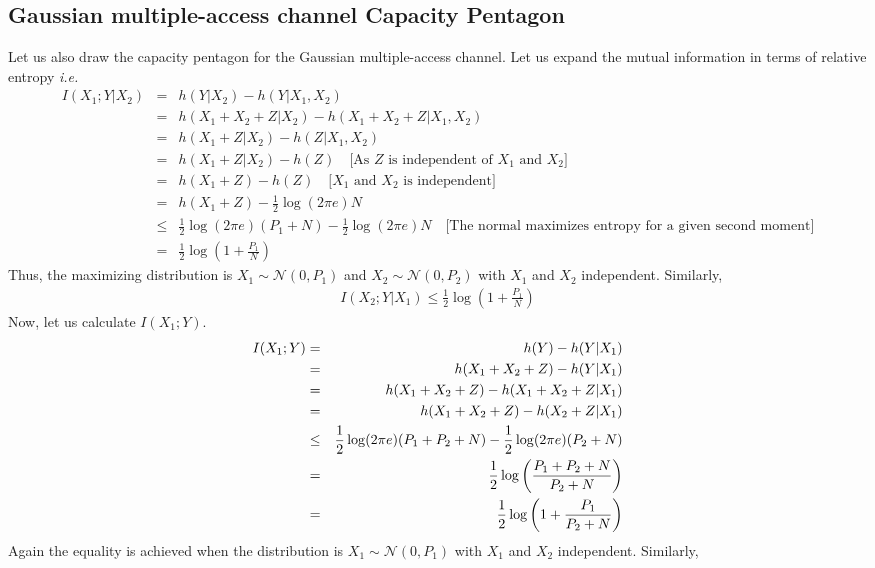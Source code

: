 \subsection{Gaussian multiple-access channel Capacity Pentagon}
Let us also draw the capacity pentagon for the Gaussian multiple-access channel. Let us expand the mutual information in terms of relative entropy \textit{i.e.}
%
\begin{eqnarray}
    I(X_1;Y|X_2) &=& h(Y|X_2) - h(Y|X_1,X_2) \nonumber\\
    &=& h(X_1+X_2+Z|X_2) - h(X_1+X_2+Z|X_1,X_2) \nonumber\\
    &=& h(X_1+Z|X_2) - h(Z|X_1,X_2) \nonumber\\
    &=& h(X_1+Z|X_2) - h(Z) \quad \text{[As $Z$ is independent of $X_1$ and $X_2$]} \nonumber\\
    &=& h(X_1+Z) - h(Z) \quad \text{[$X_1$ and $X_2$ is independent]} \nonumber\\
    &=& h(X_1+Z) - \frac{1}{2}\log(2\pi e)N \nonumber\\
    &\leq& \frac{1}{2}\log(2\pi e)(P_1+N) - \frac{1}{2}\log(2\pi e)N \quad \text{[The normal maximizes entropy for a given second moment]} \nonumber\\
    &=& \frac{1}{2}\log(1+\frac{P_1}{N})
\end{eqnarray}
%
Thus, the maximizing distribution is $X_1 \sim \mathcal{N}(0,P_1)$ and $X_2 \sim \mathcal{N}(0,P_2)$ with $X_1$ and $X_2$ independent. Similarly,
%
\begin{eqnarray}
    I(X_2;Y|X_1) \leq \frac{1}{2}\log(1+\frac{P_1}{N})
\end{eqnarray}
%
Now, let us calculate $I(X_1;Y)$. 
%
\begin{eqnarray}
   I(X_1;Y) &=& h(Y)-h(Y|X_1) \nonumber\\
   &=& h(X_1+X_2+Z)-h(Y|X_1) \nonumber\\
   &=& h(X_1+X_2+Z)-h(X_1+X_2+Z|X_1) \nonumber\\
   &=& h(X_1+X_2+Z)-h(X_2+Z|X_1) \nonumber\\
   &\leq& \frac{1}{2}\log(2\pi e)(P_1+P_2+N)-\frac{1}{2}\log(2\pi e)(P_2+N) \nonumber\\
   &=& \frac{1}{2}\log\left(\frac{P_1+P_2+N}{P_2+N}\right) \nonumber\\
   &=& \frac{1}{2}\log\left(1+\frac{P_1}{P_2+N}\right) \nonumber\\
\end{eqnarray}
%
Again the equality is achieved when the distribution is $X_1 \sim \mathcal{N}(0,P_1)$ with $X_1$ and $X_2$ independent. Similarly,

